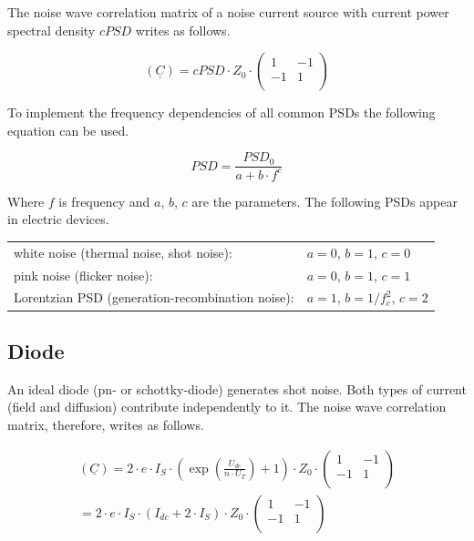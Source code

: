 \documentclass[10pt]{report}
\begin{document}
The noise wave correlation matrix of a noise current source with
current power spectral density $cPSD$ writes as follows.

\begin{equation}
(\underline{C}) = cPSD\cdot Z_0\cdot
\begin{pmatrix}
   1 & -1\\
  -1 &  1\\
\end{pmatrix}
\end{equation}

To implement the frequency dependencies of all common PSDs the
following equation can be used.

\begin{equation}
PSD = \frac{PSD_0}{a+b\cdot f^c}
\end{equation}

Where $f$ is frequency and $a$, $b$, $c$ are the parameters.  The
following PSDs appear in electric devices.

\addvspace{12pt}

\begin{tabular}{ll}
white noise (thermal noise, shot noise):         & $a=0$, $b=1$, $c=0$ \\
pink noise (flicker noise):                      & $a=0$, $b=1$, $c=1$ \\
Lorentzian PSD (generation-recombination noise): & $a=1$, $b=1/f_c^2$, $c=2$ \\
\end{tabular}


\subsection{Diode}

An ideal diode (pn- or schottky-diode) generates shot noise. Both types of current
(field and diffusion) contribute independently to it. The noise wave correlation
matrix, therefore, writes as follows.

\begin{equation}
\begin{split}
(\underline{C})
 = 2\cdot e\cdot I_S\cdot \left( \exp\left( \frac{U_{dc}}{n\cdot U_T} \right) +1 \right) \cdot Z_0\cdot\begin{pmatrix}
   1 & -1\\
  -1 &  1\\
\end{pmatrix} \\
 = 2\cdot e\cdot I_S\cdot (I_{dc}+2\cdot I_S)\cdot Z_0\cdot
\begin{pmatrix}
   1 & -1\\
  -1 &  1\\
\end{pmatrix}
\end{split}
\label{eqn:diode_noise}
\end{equation}
\end{document}
